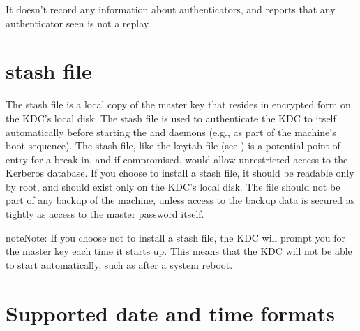 \documentclass[letterpaper,10pt,english]{sphinxmanual}
\begin{document}
It doesn’t record any information about authenticators, and reports
that any authenticator seen is not a replay.


\chapter{stash file}
\label{\detokenize{basic/stash_file_def:stash-file}}\label{\detokenize{basic/stash_file_def::doc}}\label{\detokenize{basic/stash_file_def:stash-definition}}
The stash file is a local copy of the master key that resides in
encrypted form on the KDC’s local disk.  The stash file is used to
authenticate the KDC to itself automatically before starting the
 and  daemons (e.g., as part of the
machine’s boot sequence).  The stash file, like the keytab file (see
) is a potential point-of-entry for a break-in, and
if compromised, would allow unrestricted access to the Kerberos
database.  If you choose to install a stash file, it should be
readable only by root, and should exist only on the KDC’s local disk.
The file should not be part of any backup of the machine, unless
access to the backup data is secured as tightly as access to the
master password itself.

\begin{sphinxadmonition}{note}{Note:}
If you choose not to install a stash file, the KDC will prompt you for the master key each time it starts up.
This means that the KDC will not be able to start automatically, such as after a system reboot.
\end{sphinxadmonition}


\chapter{Supported date and time formats}
\label{\detokenize{basic/date_format:supported-date-and-time-formats}}\label{\detokenize{basic/date_format::doc}}\label{\detokenize{basic/date_format:datetime}}
\end{document}

